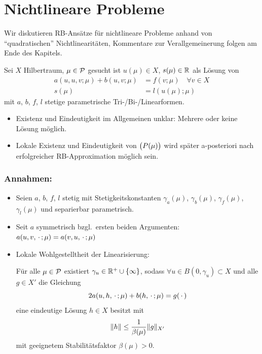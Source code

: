 \section{Nichtlineare Probleme}
\label{sec-5}

Wir diskutieren RB-Ansätze für nichtlineare Probleme anhand von ``quadratischen'' Nichtlinearitäten, Kommentare zur Verallgemeinerung folgen am Ende des Kapitels.

\begin{defn}
	Sei $X$ Hilbertraum, $\mu \in \mathcal{P}$ gesucht ist $u(\mu) \in X$, $s(\mu) \in \mathbb{R}$ als Lösung von
	\begin{align*}
		a(u,u,v;\mu) + b(u,v;\mu) &= f(v;\mu) \quad \forall v \in X\\
		s(\mu) &= l(u(\mu);\mu)
	\end{align*}
	mit $a$, $b$, $f$, $l$ stetige parametrische Tri-/Bi-/Linearformen.
\end{defn}

\begin{bem}[Wohlgestelltheit] \beginwithlistbem
	\begin{itemize}
		\item Existenz und Eindeutigkeit im Allgemeinen unklar: Mehrere oder keine Lösung möglich.
		\item Lokale Existenz und Eindeutigkeit von $\big(P(\mu)\big)$ wird später a-posteriori nach erfolgreicher RB-Approximation möglich sein.
	\end{itemize}
\end{bem}

\subsubsection*{Annahmen:}
\begin{itemize}
	\item Seien $a$, $b$, $f$, $l$ stetig mit Stetigkeitskonstanten $\gamma_a(\mu)$, $\gamma_b(\mu)$, $\gamma_f(\mu)$, $\gamma_l(\mu)$ und separierbar parametrisch.
	\item Seit $a$ symmetrisch bzgl.\ ersten beiden Argumenten: $a(u,v,\,\cdot\,;\mu) = a(v,u,\,\cdot\,;\mu)$
	\item Lokale Wohlgestelltheit der Linearisierung:

		Für alle $\mu \in \mathcal{P}$ existiert $\gamma_u \in \mathbb{R}^+ \cup \left\{\infty\right\}$, sodass $\forall u \in B(0,\gamma_u) \subset X$ und alle $g \in X'$ die Gleichung
		\begin{equation}
			2a(u,h,\,\cdot\,;\mu) + b(h,\,\cdot\,;\mu) = g(\,\cdot\,)
			\label{eq:5.1}
		\end{equation}
		eine eindeutige Lösung $h \in X$ besitzt mit
		\[
			\|h\| \leq \frac{1}{\beta(\mu)} \|g\|_{X'}
		\]
		mit geeignetem Stabilitätsfaktor $\beta(\mu) > 0$.
\end{itemize}

